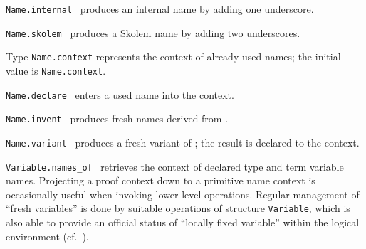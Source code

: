 \begin{isabellebody}
\begin{isamarkuptext}
  \begin{description}

  \item \verb|Name.internal|~ produces an internal name
  by adding one underscore.

  \item \verb|Name.skolem|~ produces a Skolem name by
  adding two underscores.

  \item Type \verb|Name.context| represents the context of already
  used names; the initial value is \verb|Name.context|.

  \item \verb|Name.declare|~ enters a used name into the
  context.

  \item \verb|Name.invent|~ produces  fresh names derived from .

  \item \verb|Name.variant|~ produces a fresh
  variant of ; the result is declared to the context.

  \item \verb|Variable.names_of|~ retrieves the context
  of declared type and term variable names.  Projecting a proof
  context down to a primitive name context is occasionally useful when
  invoking lower-level operations.  Regular management of ``fresh
  variables'' is done by suitable operations of structure \verb|Variable|, which is also able to provide an official status of
  ``locally fixed variable'' within the logical environment (cf.\
  ).


\end{description}
\end{isamarkuptext}
\end{isabellebody}
